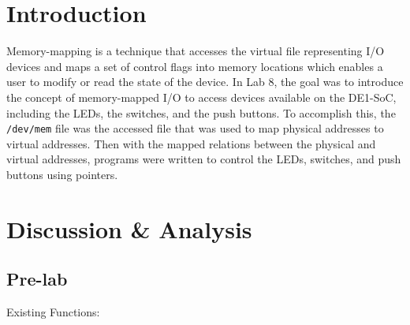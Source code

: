 \documentclass[
	letterpaper, %
	10pt, %
]{CSUniSchoolLabReport}
\begin{document}
\section{Introduction}

Memory-mapping is a technique that accesses the virtual file representing I/O devices and maps a set of control flags into memory locations which enables a user to modify or read the state of the device. In Lab 8, the goal was to introduce the concept of memory-mapped I/O to access devices available on the DE1-SoC, including the LEDs, the switches, and the push buttons. To accomplish this, the \texttt{/dev/mem} file was the accessed file that was used to map physical addresses to virtual addresses. Then with the mapped relations between the physical and virtual addresses, programs were written to control the LEDs, switches, and push buttons using pointers.

\section{Discussion \& Analysis} 

\subsection{Pre-lab}

  \item Existing Functions:
\end{document}
